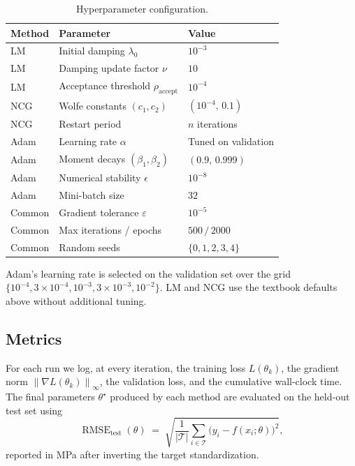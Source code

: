 \documentclass[11pt,letterpaper]{article}
\newcommand{\norm}[1]{\left\|#1\right\|}
\newcommand{\grad}{\nabla}
\DeclareMathOperator{\RMSE}{RMSE}
\theoremstyle{definition}
\begin{document}
\begin{table}[H]
\centering
\small
\caption{Hyperparameter configuration.}
\label{tab:hyperparameters}
\begin{tabular}{@{}lll@{}}
\toprule
Method & Parameter & Value \\
\midrule
LM  & Initial damping $\lambda_0$            & $10^{-3}$ \\
LM  & Damping update factor $\nu$            & $10$ \\
LM  & Acceptance threshold $\rho_{\text{accept}}$ & $10^{-4}$ \\
\addlinespace
NCG & Wolfe constants $(c_1, c_2)$           & $(10^{-4},\, 0.1)$ \\
NCG & Restart period                         & $n$ iterations \\
\addlinespace
Adam & Learning rate $\alpha$                & Tuned on validation \\
Adam & Moment decays $(\beta_1, \beta_2)$    & $(0.9,\, 0.999)$ \\
Adam & Numerical stability $\epsilon$        & $10^{-8}$ \\
Adam & Mini-batch size                       & $32$ \\
\addlinespace
Common & Gradient tolerance $\varepsilon$    & $10^{-5}$ \\
Common & Max iterations / epochs             & $500\,/\,2000$ \\
Common & Random seeds                        & $\{0,1,2,3,4\}$ \\
\bottomrule
\end{tabular}
\end{table}
 
Adam's learning rate is selected on the validation set over the grid
$\{10^{-4}, 3\!\times\!10^{-4}, 10^{-3}, 3\!\times\!10^{-3}, 10^{-2}\}$.
LM and NCG use the textbook defaults above without additional tuning.
 
\subsection{Metrics}
 
For each run we log, at every iteration, the training loss
$L(\theta_k)$, the gradient norm $\norm{\grad L(\theta_k)}_\infty$,
the validation loss, and the cumulative wall-clock time. The final
parameters $\theta^\star$ produced by each method are evaluated on the
held-out test set using
\begin{equation}
\RMSE_{\text{test}}(\theta)
\;=\;
\sqrt{\frac{1}{|\mathcal{T}|}\sum_{i \in \mathcal{T}}
\bigl(y_i - f(x_i;\theta)\bigr)^{2}},
\label{eq:rmse}
\end{equation}
reported in MPa after inverting the target standardization.
 
\end{document}
